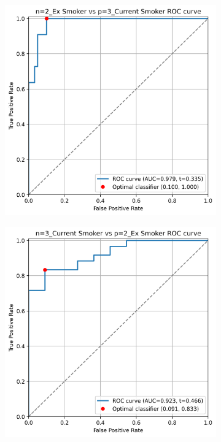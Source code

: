 \documentclass{article} %
\begin{document}
\begin{figure}[p]
    \begin{subfigure}{0.46\linewidth}
        \centering
        \includegraphics[width=\linewidth]{cohort1/test_2v3_roc.png}
    \end{subfigure}
    \hspace{4mm}
    \begin{subfigure}{0.46\linewidth}
        \centering
        \includegraphics[width=\linewidth]{cohort1/test_3v2_roc.png}
    \end{subfigure}


\end{figure}
\end{document}
